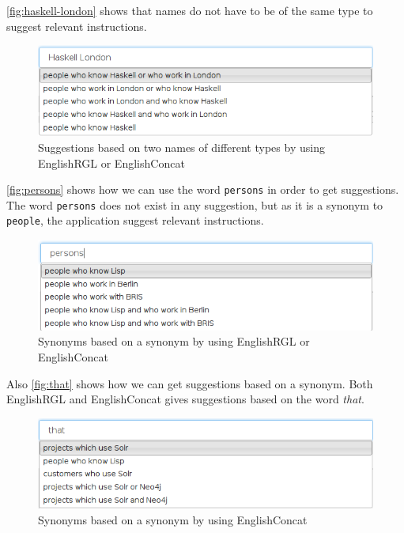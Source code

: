 \autoref{fig:haskell-london} shows that names do not have to be of the same type to suggest relevant instructions.

\begin{figure}[H]
\includegraphics[scale=0.6,keepaspectratio,valign=t]{./gfx/haskell-london.png}
\caption{Suggestions based on two names of different types by using EnglishRGL or EnglishConcat\label{fig:haskell-london}}
\end{figure}

\autoref{fig:persons} shows how we can use the word \texttt{persons} in order to get suggestions. The word \texttt{persons} does not exist in any suggestion, but as it is a synonym to \texttt{people}, the application suggest relevant instructions.

\begin{figure}[H]
\includegraphics[scale=0.6,keepaspectratio,valign=t]{./gfx/persons.png}
\caption{Synonyms based on a synonym by using EnglishRGL or EnglishConcat\label{fig:persons}}
\end{figure}

Also \autoref{fig:that} shows how we can get suggestions based on a synonym. Both EnglishRGL and EnglishConcat gives suggestions based on the word \emph{that}.

\begin{figure}[H]
\includegraphics[scale=0.6,keepaspectratio,valign=t]{./gfx/that.png}
\caption{Synonyms based on a synonym by using EnglishConcat\label{fig:that}}
\end{figure}

